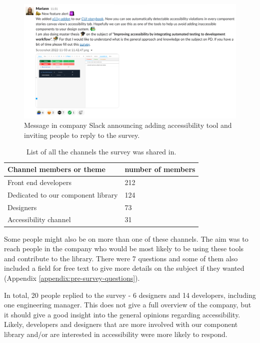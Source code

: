 \documentclass{master_thesis}
\begin{document}
\begin{figure}[H]
	\centering
	\includegraphics[width=\textwidth]{img/survey.png}
	\caption{Message in company Slack announcing adding accessibility tool and inviting people to reply to the survey.}
	\label{fig:slack-message}
\end{figure}

\begin{table}[H]
	\centering
	\caption{List of all the channels the survey was shared in.}

	\begin{tabular}{|l|l|}
		\hline
		\textbf{Channel members or theme} & \textbf{number of members}  \\
		\hline
		Front end developers  & 212  \\
		\hline
		Dedicated to our component library  & 124  \\
		\hline
		Designers  & 73  \\
		\hline
		Accessibility channel  & 31  \\
		\hline
	\end{tabular}
	\label{table:survey-shared}
\end{table}

Some people might also be on more than one of these channels. The aim was to reach people in the company who would be most likely to be using these tools and contribute to the library. There were 7 questions and some of them also included a field for free text to give more details on the subject if they wanted (Appendix \ref{appendix:pre-survey-questions}).

In total, 20 people replied to the survey - 6 designers and 14 developers, including one engineering manager. This does not give a full overview of the company, but it should give a good insight into the general opinions regarding accessibility. Likely, developers and designers that are more involved with our component library and/or are interested in accessibility were more likely to respond.
\end{document}

